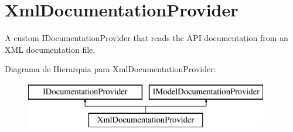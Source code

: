 \hypertarget{classApi3Layers_1_1Areas_1_1HelpPage_1_1XmlDocumentationProvider}{}\section{Xml\+Documentation\+Provider}
\label{classApi3Layers_1_1Areas_1_1HelpPage_1_1XmlDocumentationProvider}


A custom I\+Documentation\+Provider that reads the A\+PI documentation from an X\+ML documentation file.  


Diagrama de Hierarquia para Xml\+Documentation\+Provider\+:\begin{figure}[H]
\begin{center}
\leavevmode
\includegraphics[height=2.000000cm]{df/d7d/classApi3Layers_1_1Areas_1_1HelpPage_1_1XmlDocumentationProvider}
\end{center}
\end{figure}
